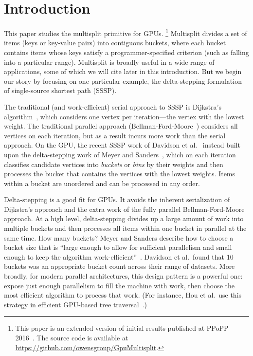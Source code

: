 \section{Introduction}\label{sec:intro}

This paper studies the multisplit primitive for GPUs.
\footnote{This paper is an extended version of initial results published at PPoPP 2016~\cite{Ashkiani:2016:GM}. The source code is available at \url{https://github.com/owensgroup/GpuMultisplit}.} 
Multisplit divides a set of items (keys or key-value pairs) into contiguous buckets, where each bucket contains items whose keys satisfy a programmer-specified criterion (such as falling into a particular range). Multisplit is broadly useful in a wide range of applications, some of which we will cite later in this introduction. But we begin our story by focusing on one particular example, the delta-stepping formulation of single-source shortest path (SSSP)\@.

The traditional (and work-efficient) serial approach to SSSP is Dijkstra's algorithm~, which considers one vertex per iteration---the vertex with the lowest weight. The traditional parallel approach (Bellman-Ford-Moore~\cite{Bang-Jensen:2009:DTA}) considers all vertices on each iteration, but as a result incurs more work than the serial approach. On the GPU, the recent SSSP work of Davidson et al.~ instead built upon the delta-stepping work of Meyer and Sanders~, which on each iteration classifies candidate vertices into \emph{buckets} or \emph{bins} by their weights and then processes the bucket that contains the vertices with the lowest weights. Items within a bucket are unordered and can be processed in any order.

Delta-stepping is a good fit for GPUs. It avoids the inherent serialization of Dijkstra's approach and the extra work of the fully parallel Bellman-Ford-Moore approach. At a high level, delta-stepping divides up a large amount of work into multiple buckets and then processes all items within one bucket in parallel at the same time. How many buckets? Meyer and Sanders describe how to choose a bucket size that is ``large enough to allow for sufficient parallelism and small enough to keep the algorithm work-efficient''~. Davidson et al.\ found that 10 buckets was an appropriate bucket count across their range of datasets. More broadly, for modern parallel architectures, this design pattern is a powerful one: expose just enough parallelism to fill the machine with work, then choose the most efficient algorithm to process that work. (For instance, Hou et al.\ use this strategy in efficient GPU-based tree traversal~.)

